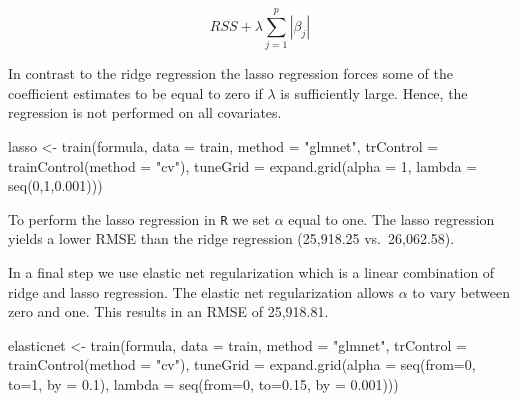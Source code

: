 \documentclass[11pt,a4paper]{article}
\newenvironment{Shaded}{\begin{snugshade}}{\end{snugshade}}
\newcommand{\AttributeTok}[1]{\textcolor[rgb]{0.77,0.63,0.00}{#1}}
\newcommand{\DecValTok}[1]{\textcolor[rgb]{0.00,0.00,0.81}{#1}}
\newcommand{\FloatTok}[1]{\textcolor[rgb]{0.00,0.00,0.81}{#1}}
\newcommand{\FunctionTok}[1]{\textcolor[rgb]{0.00,0.00,0.00}{#1}}
\newcommand{\NormalTok}[1]{#1}
\newcommand{\OtherTok}[1]{\textcolor[rgb]{0.56,0.35,0.01}{#1}}
\newcommand{\StringTok}[1]{\textcolor[rgb]{0.31,0.60,0.02}{#1}}
\begin{document}
\[
RSS + \lambda \sum^p_{j=1} | \beta_j |
\]

In contrast to the ridge regression the lasso regression forces some of
the coefficient estimates to be equal to zero if \(\lambda\) is
sufficiently large. Hence, the regression is not performed on all
covariates.

\begin{Shaded}
\begin{Highlighting}[]
\NormalTok{lasso }\OtherTok{\textless{}{-}} \FunctionTok{train}\NormalTok{(formula, }\AttributeTok{data =}\NormalTok{ train, }
       \AttributeTok{method =} \StringTok{"glmnet"}\NormalTok{, }\AttributeTok{trControl =} \FunctionTok{trainControl}\NormalTok{(}\AttributeTok{method =} \StringTok{"cv"}\NormalTok{), }
       \AttributeTok{tuneGrid =} \FunctionTok{expand.grid}\NormalTok{(}\AttributeTok{alpha =} \DecValTok{1}\NormalTok{, }\AttributeTok{lambda =} \FunctionTok{seq}\NormalTok{(}\DecValTok{0}\NormalTok{,}\DecValTok{1}\NormalTok{,}\FloatTok{0.001}\NormalTok{)))}
\end{Highlighting}
\end{Shaded}

To perform the lasso regression in \texttt{R} we set \(\alpha\) equal to
one. The lasso regression yields a lower RMSE than the ridge regression
(25,918.25 vs.~26,062.58).

In a final step we use elastic net regularization which is a linear
combination of ridge and lasso regression. The elastic net
regularization allows \(\alpha\) to vary between zero and one. This
results in an RMSE of 25,918.81.

\begin{Shaded}
\begin{Highlighting}[]
\NormalTok{elasticnet }\OtherTok{\textless{}{-}} \FunctionTok{train}\NormalTok{(formula, }\AttributeTok{data =}\NormalTok{ train,}
       \AttributeTok{method =} \StringTok{"glmnet"}\NormalTok{, }\AttributeTok{trControl =} \FunctionTok{trainControl}\NormalTok{(}\AttributeTok{method =} \StringTok{"cv"}\NormalTok{),}
       \AttributeTok{tuneGrid =} \FunctionTok{expand.grid}\NormalTok{(}\AttributeTok{alpha =} \FunctionTok{seq}\NormalTok{(}\AttributeTok{from=}\DecValTok{0}\NormalTok{, }\AttributeTok{to=}\DecValTok{1}\NormalTok{, }\AttributeTok{by =} \FloatTok{0.1}\NormalTok{),}
       \AttributeTok{lambda =} \FunctionTok{seq}\NormalTok{(}\AttributeTok{from=}\DecValTok{0}\NormalTok{, }\AttributeTok{to=}\FloatTok{0.15}\NormalTok{, }\AttributeTok{by =} \FloatTok{0.001}\NormalTok{)))}
\end{Highlighting}
\end{Shaded}
\end{document}
